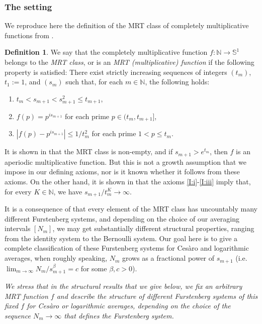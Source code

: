\documentclass[11pt]{amsart}
\theoremstyle{definition}
\newtheorem{definition}{Definition}[section]
\newcommand{\N}{{\mathbb N}}
\renewcommand{\S}{\mathbb{S}}
\begin{document}
\subsubsection{The setting}\label{SSS:MRT}
We reproduce here the definition of the  MRT class of completely  multiplicative functions from
\cite[Definition~3.1]{GLR21}.
\begin{definition}\label{D:MRT}
We say that the completely  multiplicative function $f\colon \N\to \S^1$ belongs to the {\em MRT class},
or is an {\em MRT (multiplicative) function}  if the following property is satisfied: There exist strictly  increasing sequences of integers $(t_m)$, $t_1:=1$,  and $(s_m)$ such that, for each $m\in \N$, the following holds:  	

\begin{enumerate}
	\item \label{I:i} $t_m<s_{m+1}<s_{m+1}^2\leq t_{m+1}$,
	
	\medskip
	
	\item \label{I:ii} $f(p)=p^{is_{m+1}}$ for each prime $p\in(t_m,t_{m+1}]$, 	
	
	\medskip
	
	\item \label{I:iii} $|f(p)-p^{is_{m+1}}|\leq 1/t_m^2$ for each prime $1<p\leq t_m$.
\end{enumerate}
\end{definition}
It is shown in \cite[Appendix~B]{MRT15} that the MRT class is non-empty, and if $s_{m+1}>e^{t_m}$, then  $f$ is an aperiodic multiplicative function. But this is not a growth assumption that we impose in our defining axioms, nor is it known whether it follows from these axioms.
On the other hand, it is  shown in \cite{GLR21} that the axioms \eqref{I:i}-\eqref{I:iii} imply that,  for every $K\in \N$, we have $s_{m+1}/t^K_m\to\infty$.

It is a consequence of \cite{GLR21} that every element  of the MRT class has uncountably many different Furstenberg systems, and depending on the choice of our averaging intervals $[N_m]$, we may get substantially different structural properties, ranging from the identity system to  the Bernoulli system. Our goal here is to give
a complete classification of these Furstenberg systems for Ces\`aro and logarithmic averages, when roughly speaking, $N_m$ grows as a fractional power of $s_{m+1}$ (i.e. $\lim_{m\to\infty} N_m/s_{m+1}^\beta= c$ for some $\beta,c>0$).

{\em We stress that in the structural results that we give below, we fix an arbitrary MRT function $f$ and describe the structure of different  Furstenberg systems of this fixed $f$ for Ces\`aro or logarithmic averages,  depending  on the choice of the sequence $N_m\to \infty$ that defines the Furstenberg system.}
\end{document}
